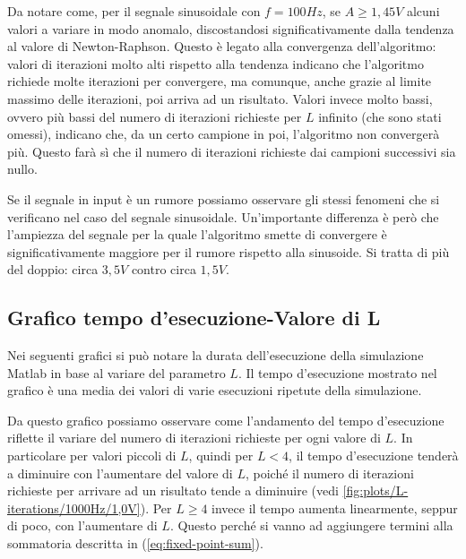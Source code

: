 			Da notare come, per il segnale sinusoidale con $f = 100Hz$, se $A \ge 1,45V$ alcuni valori a variare in modo anomalo, discostandosi significativamente dalla tendenza al valore di Newton-Raphson. Questo è legato alla convergenza dell'algoritmo: valori di iterazioni molto alti rispetto alla tendenza indicano che l'algoritmo richiede molte iterazioni per convergere, ma comunque, anche grazie al limite massimo delle iterazioni, poi arriva ad un risultato. Valori invece molto bassi, ovvero più bassi del numero di iterazioni richieste per $L$ infinito (che sono stati omessi), indicano che, da un certo campione in poi, l'algoritmo non convergerà più. Questo farà sì che il numero di iterazioni richieste dai campioni successivi sia nullo.
			
			\graficospace
			\graficospace
			\graficospace
			
			Se il segnale in input è un rumore possiamo osservare gli stessi fenomeni che si verificano nel caso del segnale sinusoidale. Un'importante differenza è però che l'ampiezza del segnale per la quale l'algoritmo smette di convergere è significativamente maggiore per il rumore rispetto alla sinusoide. Si tratta di più del doppio: circa $3,5V$ contro circa $1,5V$.
			\pagebreak
			
		\subsection{Grafico tempo d'esecuzione-Valore di L}
			\label{subsec:tempo_esecuzione}
			Nei seguenti grafici si può notare la durata dell'esecuzione della simulazione Matlab in base al variare del parametro $L$. Il tempo d'esecuzione mostrato nel grafico è una media dei valori di varie esecuzioni ripetute della simulazione.
			
			\graficospace
			
			Da questo grafico possiamo osservare come l'andamento del tempo d'esecuzione riflette il variare del numero di iterazioni richieste per ogni valore di $L$. In particolare per valori piccoli di $L$, quindi per $L < 4$, il tempo d'esecuzione tenderà a diminuire con l'aumentare del valore di $L$, poiché il numero di iterazioni richieste per arrivare ad un risultato tende a diminuire (vedi \ref{fig:plots/L-iterations/1000Hz/1,0V}). Per $L \ge 4$ invece il tempo aumenta linearmente, seppur di poco, con l'aumentare di $L$. Questo perché si vanno ad aggiungere termini alla sommatoria descritta in (\ref{eq:fixed-point-sum}).
			
